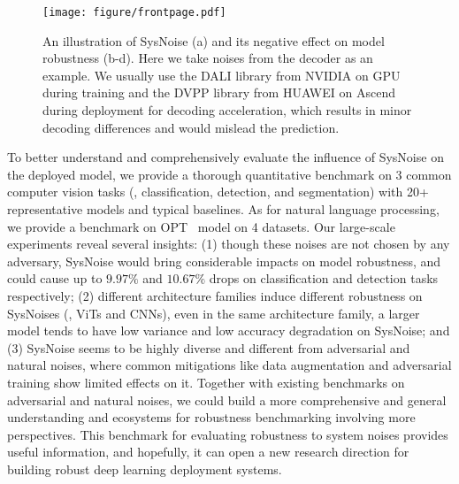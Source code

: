 \begin{figure*}[t]

    \centering
    \texttt{[image: figure/frontpage.pdf]}
    \caption{An illustration of SysNoise (a) and its negative effect on model robustness (b-d). Here we take noises from the decoder as an example. We usually use the DALI library from NVIDIA on GPU during training and the DVPP library from HUAWEI on Ascend during deployment for decoding acceleration, which results in minor decoding differences and would mislead the prediction.}
    \label{fig_frontpage}
        
\end{figure*}

To better understand and comprehensively evaluate the influence of SysNoise on the deployed model, we provide a thorough quantitative benchmark on 3 common computer vision tasks (\ie, classification, detection, and segmentation) with 20+ representative models and typical baselines. As for natural language processing, we provide a benchmark on OPT~\cite{opt} model on 4 datasets. Our large-scale experiments reveal several insights: (1) though these noises are not chosen by any adversary, SysNoise would bring considerable impacts on model robustness, and could cause up to $9.97\%$ and $10.67\%$ drops on classification and detection tasks respectively; (2) different architecture families induce different robustness on SysNoises (\eg, ViTs and CNNs), even in the same architecture family, a larger model tends to have low variance and low accuracy degradation on SysNoise; and (3) SysNoise seems to be highly diverse and different from adversarial and natural noises, where common mitigations like data augmentation and adversarial training show limited effects on it. Together with existing benchmarks on adversarial and natural noises, we could build a more comprehensive and general understanding and ecosystems for robustness benchmarking involving more perspectives. This benchmark for evaluating robustness to system noises provides useful information, and hopefully, it can open a new research direction for building robust deep learning deployment systems. 

